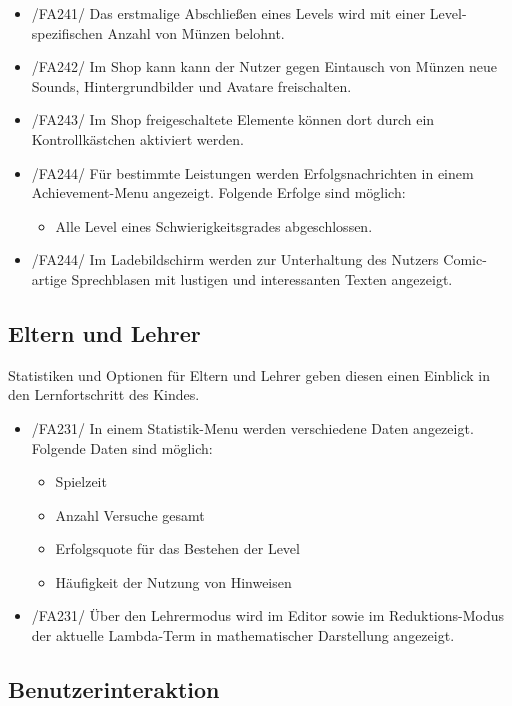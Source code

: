 \begin{itemize}
\item /FA241/ Das erstmalige Abschließen eines Levels wird mit einer Level-spezifischen Anzahl von Münzen belohnt.
\item /FA242/ Im Shop kann kann der Nutzer gegen Eintausch von Münzen neue Sounds, Hintergrundbilder und Avatare freischalten.
\item /FA243/ Im Shop freigeschaltete Elemente können dort durch ein Kontrollkästchen aktiviert werden.
\item /FA244/ Für bestimmte Leistungen werden Erfolgsnachrichten in einem Achievement-Menu angezeigt. Folgende Erfolge sind möglich:
\begin{itemize}
\item Alle Level eines Schwierigkeitsgrades abgeschlossen.
\end{itemize}
\item /FA244/ Im Ladebildschirm werden zur Unterhaltung des Nutzers Comic-artige Sprechblasen mit lustigen und interessanten Texten angezeigt.
\end{itemize}

\subsection{Eltern und Lehrer}

Statistiken und Optionen für Eltern und Lehrer geben diesen einen Einblick in den Lernfortschritt des Kindes.

\begin{itemize}
\item /FA231/ In einem Statistik-Menu werden verschiedene Daten angezeigt. Folgende Daten sind möglich:
\begin{itemize}
\item Spielzeit
\item Anzahl Versuche gesamt
\item Erfolgsquote für das Bestehen der Level
\item Häufigkeit der Nutzung von Hinweisen
\end{itemize}
\item /FA231/ Über den Lehrermodus wird im Editor sowie im Reduktions-Modus der aktuelle Lambda-Term in mathematischer Darstellung angezeigt.
\end{itemize}

\subsection{Benutzerinteraktion}

